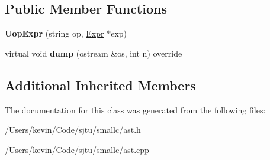 \subsection*{Public Member Functions}
\begin{DoxyCompactItemize}
\item 
\mbox{\label{class_uop_expr_afee1fe4e395a5e78a00da75a392b6412}} 
{\bfseries Uop\+Expr} (string op, \hyperlink{class_expr}{Expr} $\ast$exp)
\item 
\mbox{\label{class_uop_expr_ab784d7b27f994ea2182d89bf430759a2}} 
virtual void {\bfseries dump} (ostream \&os, int n) override
\end{DoxyCompactItemize}
\subsection*{Additional Inherited Members}


The documentation for this class was generated from the following files\+:\begin{DoxyCompactItemize}
\item 
/\+Users/kevin/\+Code/sjtu/smallc/ast.\+h\item 
/\+Users/kevin/\+Code/sjtu/smallc/ast.\+cpp\end{DoxyCompactItemize}
